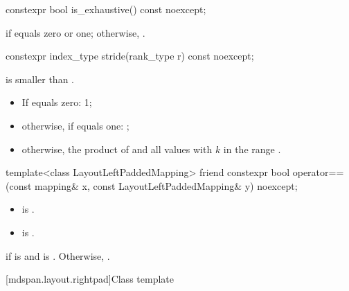\begin{itemdecl}
constexpr bool is_exhaustive() const noexcept;
\end{itemdecl}

\begin{itemdescr}
\pnum
\returns
{} if  equals zero or one;
otherwise, .
\end{itemdescr}

\begin{itemdecl}
constexpr index_type stride(rank_type r) const noexcept;
\end{itemdecl}

\begin{itemdescr}
\pnum
\expects
{} is smaller than .

\pnum
\returns
\begin{itemize}
\item
If  equals zero: 1;
\item
otherwise, if  equals one: ;
\item
otherwise, the product of  and
all values  with $k$ in the range .
\end{itemize}
\end{itemdescr}

\begin{itemdecl}
template<class LayoutLeftPaddedMapping>
  friend constexpr bool operator==(const mapping& x, const LayoutLeftPaddedMapping& y) noexcept;
\end{itemdecl}

\begin{itemdescr}
\pnum
\constraints
\begin{itemize}
\item
{}
is .
\item
{} is .
\end{itemize}

\pnum
\returns
{} if  is  and
 is .
Otherwise, .
\end{itemdescr}

[mdspan.layout.rightpad]{Class template }

